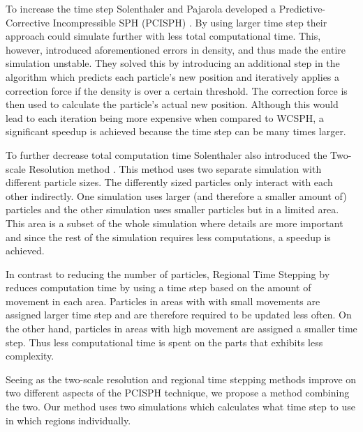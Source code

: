 \documentclass[../../main.tex]{subfiles}
\begin{document}
To increase the time step Solenthaler and Pajarola developed a Predictive-Corrective Incompressible SPH (PCISPH) \citep{solenthaler2009predictive}. By using larger time step their approach could simulate further with less total computational time. This, however, introduced aforementioned errors in density, and thus made the entire simulation unstable. They solved this by introducing an additional step in the algorithm which predicts each particle's new position and iteratively applies a correction force if the density is over a certain threshold. The correction force is then used to calculate the particle's actual new position. Although this would lead to each iteration being more expensive when compared to WCSPH, a significant speedup is achieved because the time step can be many times larger.

To further decrease total computation time Solenthaler also introduced the Two-scale Resolution method \citep{solenthaler2011two}. This method uses two separate simulation with different particle sizes. The differently sized particles only interact with each other indirectly. One simulation uses larger (and therefore a smaller amount of) particles and the other simulation uses smaller particles but in a limited area. This area is a subset of the whole simulation where details are more important and since the rest of the simulation requires less computations, a speedup is achieved. 

In contrast to reducing the number of particles, Regional Time Stepping by \citet{goswami2014regional} reduces computation time by using a time step based on the amount of movement in each area. Particles in areas with with small movements are assigned larger time step and are therefore required to be updated less often. On the other hand, particles in areas with high movement are assigned a smaller time step. Thus less computational time is spent on the parts that exhibits less complexity.

Seeing as the two-scale resolution and regional time stepping methods improve on two different aspects of the PCISPH technique, we propose a method combining the two. Our method uses two simulations which calculates what time step to use in which regions individually.

\end{document}
